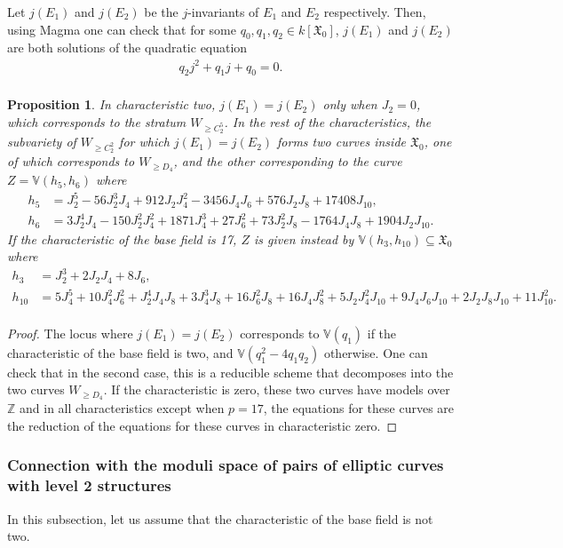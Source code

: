 \documentclass{amsart}
\numberwithin{equation}{section}
\newtheorem{proposition}[theorem]{Proposition}
\theoremstyle{definition}
\theoremstyle{remark}
\begin{document}
Let $j(E_1)$ and $j(E_2)$ be the $j$-invariants of $E_1$ and $E_2$ respectively. Then, using Magma one can check that for some $q_0, q_1, q_2\in k[\mathfrak{X}_0]$, $j(E_1)$ and $j(E_2)$ are both solutions of the quadratic equation
\begin{align*}
q_2j^2+q_1j+q_0=0.\\
\end{align*}

\begin{proposition} \label{j_prop}
In characteristic two, $j(E_1)=j(E_2)$ only when $J_2=0$, which corresponds to the stratum $W_{\geq C_2^5}$. In the rest of the characteristics, the subvariety of $W_{\geq C_2^2}$ for which $j(E_1)=j(E_2)$ forms two curves inside $\mathfrak{X}_0$, one of which corresponds to $W_{\geq D_4}$, and the other corresponding to the curve $Z=\mathbb{V}(h_5,h_6)$ where
\begin{align*}
h_5&=J_2^5 - 56J_2^3J_4 + 912J_2J_4^2 - 3456J_4J_6 + 576J_2J_8 + 17408J_{10},\\
h_6&=3J_2^4J_4 - 150J_2^2J_4^2 + 1871J_4^3 + 27J_6^2 + 73J_2^2J_8 - 1764J_4J_8 + 
        1904J_2J_{10}.
\end{align*}\newpage
If the characteristic of the base field is 17, $Z$ is given instead by $\mathbb{V}(h_3,h_{10})\subseteq\mathfrak{X}_0$ where
\begin{align*}
h_3 &= J_2^3 + 2J_2J_4 + 8J_6,\\
h_{10} &= 5J_4^5 + 10J_4^2J_6^2 + J_2^4J_4J_8 + 3J_4^3J_8 + 16J_6^2J_8 + 16J_4J_8^2 + 5J_2J_4^2J_{10} + 9J_4J_6J_{10} + 2J_2J_8J_{10} + 11J_{10}^2.\\
\end{align*}
\end{proposition}
\begin{proof}
The locus where $j(E_1)=j(E_2)$ corresponds to $\mathbb{V}(q_1)$ if the characteristic of the base field is two, and $\mathbb{V}(q_1^2-4q_1q_2)$ otherwise. One can check that in the second case, this is a reducible scheme that decomposes into the two curves $W_{\geq D_4}$. If the characteristic is zero, these two curves have models over $\mathbb{Z}$ and in all characteristics except when $p=17$, the equations for these curves are the reduction of the equations for these curves in characteristic zero.
\end{proof}


\subsubsection{Connection with the moduli space of pairs of elliptic curves with level 2 structures} \label{connection_subsection}
In this subsection, let us assume that the characteristic of the base field is not two.\\
\end{document}
